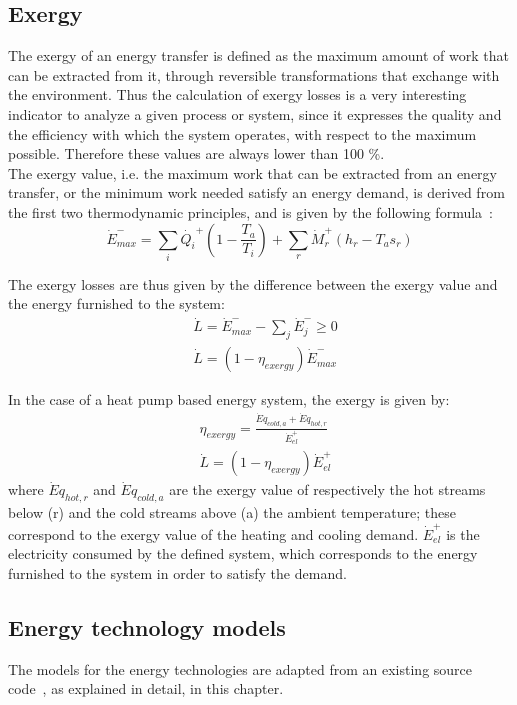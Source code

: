 \documentclass{article}
\begin{document}
\subsection{Exergy}\label{ss:exergy}
The exergy of an energy transfer is defined as the maximum amount of work that can be extracted from it, through reversible transformations that exchange with the environment. Thus the calculation of exergy losses is a very interesting indicator to analyze a given process or system, since it expresses the quality and the efficiency with which the system operates, with respect to the maximum possible. Therefore these values are always lower than 100 \%. \\

The exergy value, i.e. the maximum work that can be extracted from an energy transfer, or the minimum work needed satisfy an energy demand, is derived from the first two thermodynamic principles, and is given by the following formula~\cite{henchozPotentialRefrigerantBased2016}:
\begin{equation}
    \dot{E}^{-}_{max} = \sum_{i} \dot{Q_i}^{+} (1 - \frac{T_{a}}{T_i} ) + \sum_{r} \dot{M}_{r}^{+} (h_{r} - T_{a} s_{r})    
\end{equation}

The exergy losses are thus given by the difference between the exergy value and the energy furnished to the system:
\begin{align}
	&    \dot{L} = \dot{E}^{-}_{max} - \sum_{j}\dot{E}^{-}_{j} \geq 0 \\
	& 	\dot{L} = (1-\eta_{exergy})\dot{E}^{-}_{max}
\end{align}

In the case of a heat pump based energy system, the exergy is given by:
\begin{align}
    & \eta_{exergy} =  \frac{\dot{E}q_{cold,a} + \dot{E}q_{hot,r}}{\dot{E}_{el}^{+}}  \\
    & \dot{L} = (1-\eta_{exergy})\dot{E}_{el}^{+}
\end{align}
where $\dot{E}q_{hot,r}$  and $\dot{E}q_{cold,a}$ are the exergy value of respectively the hot streams below (r) and the cold streams above (a) the ambient temperature; these correspond to the exergy value of the heating and cooling demand. $\dot{E}_{el}^{+}$ is the electricity consumed by the defined system, which corresponds to the energy furnished to the system in order to satisfy the demand.

\subsection{Energy technology models}\label{ss:et}
The models for the energy technologies are adapted from an existing source code~\cite{suciuEnergyautonomousCitiesUsing2016}, as explained in detail, in this chapter.
\end{document}
